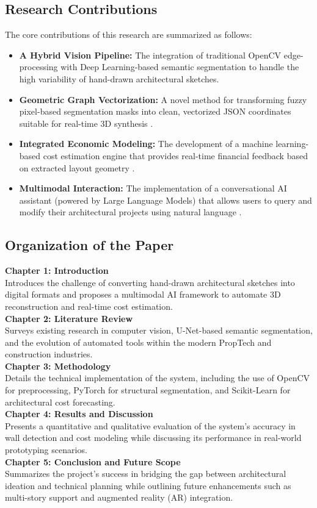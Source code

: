 \documentclass[10pt, conference, a4paper]{IEEEtran}
\begin{document}
\subsection{Research Contributions}
The core contributions of this research are summarized as follows:
\begin{itemize}
    \item \textbf{A Hybrid Vision Pipeline:} The integration of traditional OpenCV \cite{8} edge-processing with Deep Learning-based semantic segmentation \cite{1} to handle the high variability of hand-drawn architectural sketches.
    \item \textbf{Geometric Graph Vectorization:} A novel method for transforming fuzzy pixel-based segmentation masks into clean, vectorized JSON coordinates suitable for real-time 3D synthesis \cite{7, 10}.
    \item \textbf{Integrated Economic Modeling:} The development of a machine learning-based cost estimation engine that provides real-time financial feedback based on extracted layout geometry \cite{6}.
    \item \textbf{Multimodal Interaction:} The implementation of a conversational AI assistant (powered by Large Language Models) that allows users to query and modify their architectural projects using natural language \cite{2, 15}.
\end{itemize}

\subsection{Organization of the Paper}
\textbf{Chapter 1: Introduction} \\ Introduces the challenge of converting hand-drawn architectural sketches into digital formats and proposes a multimodal AI framework to automate 3D reconstruction and real-time cost estimation. \\
\textbf{Chapter 2: Literature Review} \\ Surveys existing research in computer vision, U-Net-based semantic segmentation, and the evolution of automated tools within the modern PropTech and construction industries. \\
\textbf{Chapter 3: Methodology} \\ Details the technical implementation of the system, including the use of OpenCV for preprocessing, PyTorch for structural segmentation, and Scikit-Learn for architectural cost forecasting. \\
\textbf{Chapter 4: Results and Discussion} \\ Presents a quantitative and qualitative evaluation of the system’s accuracy in wall detection and cost modeling while discussing its performance in real-world prototyping scenarios. \\
\textbf{Chapter 5: Conclusion and Future Scope} \\ Summarizes the project’s success in bridging the gap between architectural ideation and technical planning while outlining future enhancements such as multi-story support and augmented reality (AR) integration.
\end{document}
